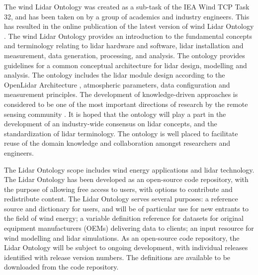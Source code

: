 \documentclass[remotesensing,article,submit,pdftex,moreauthors]{Definitions/mdpi}
\begin{document}
The wind Lidar Ontology \cite{ref-Clifton-Costa} was created as a sub-task of the IEA Wind TCP Task 32, and has been taken on by a group of academics and industry engineers.
This has resulted in the online publication of the latest version of wind Lidar Ontology \cite{ref-OntoWeb}.
The wind Lidar Ontology provides an introduction to the fundamental concepts and terminology relating to lidar hardware and software, lidar installation and measurement, data generation, processing, and analysis.
The ontology provides guidelines for a common conceptual architecture for lidar design, modelling and analysis.
The ontology includes the lidar module design according to the OpenLidar Architecture \cite{clifton_andrew_2019_3414197}, atmospheric parameters, data configuration and measurement principles.
The development of knowledge-driven approaches is considered to be one of the most important directions of research by the remote sensing community \cite{ref-Arvor_2019}.
It is hoped that the ontology will play a part in the development of an industry-wide consensus on lidar concepts, and the standardization of lidar terminology.
The ontology is well placed to facilitate reuse of the domain knowledge and collaboration amongst researchers and engineers.

The Lidar Ontology scope includes wind energy applications and lidar technology.
The Lidar Ontology has been developed as an open-source code repository, with the purpose of allowing
free access to users, with options to contribute and redistribute content.
The Lidar Ontology serves several purposes: a reference source and dictionary for users, and will be of particular
use for new entrants to the field of wind energy;
a variable definition reference for datasets for original equipment manufacturers (OEMs) delivering data to clients;
an input resource for wind modelling and lidar simulations.
As an open-source code repository, the Lidar Ontology will be subject to ongoing development, with individual releases identified with release version numbers.
The definitions are available to be downloaded from the code repository.
\end{document}
